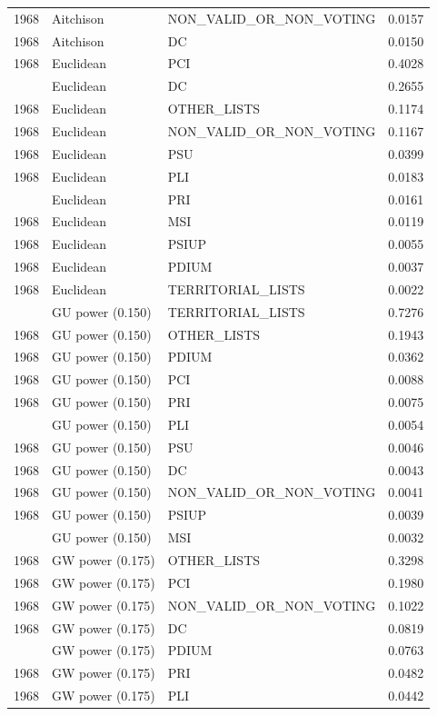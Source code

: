 \begin{longtable}[t]{rllr}
1968 & Aitchison & NON\_VALID\_OR\_NON\_VOTING & 0.0157\\
1968 & Aitchison & DC & 0.0150\\
1968 & Euclidean & PCI & 0.4028\\
\addlinespace
1968 & Euclidean & DC & 0.2655\\
1968 & Euclidean & OTHER\_LISTS & 0.1174\\
1968 & Euclidean & NON\_VALID\_OR\_NON\_VOTING & 0.1167\\
1968 & Euclidean & PSU & 0.0399\\
1968 & Euclidean & PLI & 0.0183\\
\addlinespace
1968 & Euclidean & PRI & 0.0161\\
1968 & Euclidean & MSI & 0.0119\\
1968 & Euclidean & PSIUP & 0.0055\\
1968 & Euclidean & PDIUM & 0.0037\\
1968 & Euclidean & TERRITORIAL\_LISTS & 0.0022\\
\addlinespace
1968 & GU power (0.150) & TERRITORIAL\_LISTS & 0.7276\\
1968 & GU power (0.150) & OTHER\_LISTS & 0.1943\\
1968 & GU power (0.150) & PDIUM & 0.0362\\
1968 & GU power (0.150) & PCI & 0.0088\\
1968 & GU power (0.150) & PRI & 0.0075\\
\addlinespace
1968 & GU power (0.150) & PLI & 0.0054\\
1968 & GU power (0.150) & PSU & 0.0046\\
1968 & GU power (0.150) & DC & 0.0043\\
1968 & GU power (0.150) & NON\_VALID\_OR\_NON\_VOTING & 0.0041\\
1968 & GU power (0.150) & PSIUP & 0.0039\\
\addlinespace
1968 & GU power (0.150) & MSI & 0.0032\\
1968 & GW power (0.175) & OTHER\_LISTS & 0.3298\\
1968 & GW power (0.175) & PCI & 0.1980\\
1968 & GW power (0.175) & NON\_VALID\_OR\_NON\_VOTING & 0.1022\\
1968 & GW power (0.175) & DC & 0.0819\\
\addlinespace
1968 & GW power (0.175) & PDIUM & 0.0763\\
1968 & GW power (0.175) & PRI & 0.0482\\
1968 & GW power (0.175) & PLI & 0.0442\\

\end{longtable}

